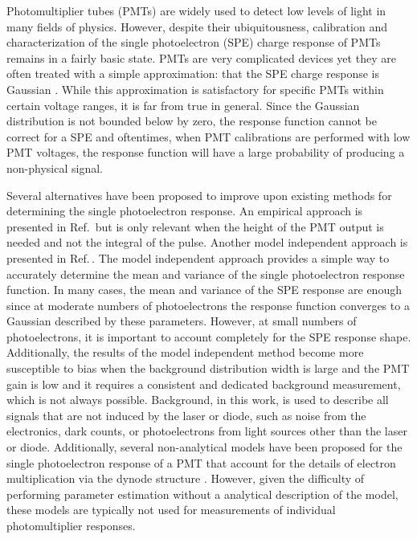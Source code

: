 \documentclass[11pt,a4paper]{article}
\newcommand\citeref[1]{Ref.\,\cite{#1}}
\begin{document}
Photomultiplier tubes (PMTs) are widely used to detect low levels of light in many fields of physics.  However, despite their ubiquitousness, calibration and characterization of the single photoelectron (SPE) charge response of PMTs remains in a fairly basic state.  PMTs are very complicated devices yet they are often treated with a simple approximation: that the SPE charge response is Gaussian \cite{bellamy, dossi}. While this approximation is satisfactory for specific PMTs within certain voltage ranges, it is far from true in general.  Since the Gaussian distribution is not bounded below by zero, the response function cannot be correct for a SPE and oftentimes, when PMT calibrations are performed with low PMT voltages, the response function will have a large probability of producing a non-physical signal. 

Several alternatives have been proposed to improve upon existing methods for determining the single photoelectron response.  An empirical approach is presented in \citeref{haas} but is only relevant when the height of the PMT output is needed and not the integral of the pulse.  Another model independent approach is presented in \citeref{saldanha}.  The model independent approach provides a simple way to accurately determine the mean and variance of the single photoelectron response function.  In many cases, the mean and variance of the SPE response are  enough since at moderate numbers of photoelectrons the response function converges to a Gaussian described by these parameters.  However, at small numbers of photoelectrons, it is important to account completely for the SPE response shape.  Additionally, the results of the model independent method become more susceptible to bias when the background distribution width is large and the PMT gain is low and it requires a consistent and dedicated background measurement, which is not always possible.  Background, in this work, is used to describe all signals that are not induced by the laser or diode, such as noise from the electronics, dark counts, or photoelectrons from light sources other than the laser or diode.  Additionally, several non-analytical models have been proposed for the single photoelectron response of a PMT that account for the details of electron multiplication via the dynode structure \cite{lombard,prescott}.  However, given the difficulty of performing parameter estimation without a analytical description of the model, these models are typically not used for measurements of individual photomultiplier responses.
\end{document}

